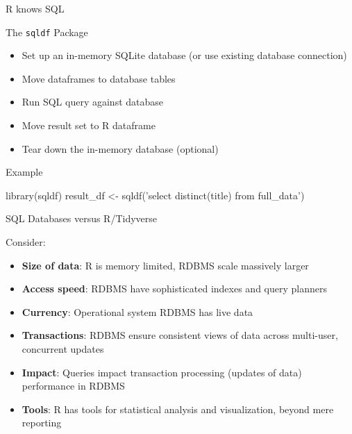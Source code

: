 \documentclass[ignorenonframetext,xcolor=x11names]{beamer}
\begin{document}
\begin{frame}[fragile]{R knows SQL}

\begin{block}{The \texttt{sqldf} Package}
  \begin{itemize}
     \item Set up an in-memory SQLite database (or use existing database connection)
     \item Move dataframes to database tables
     \item Run SQL query against database
     \item Move result set to R dataframe
     \item Tear down the in-memory database (optional)
  \end{itemize}
\end{block}

\begin{block}{Example}
\small
\begin{Rcode}
library(sqldf)
result_df <- 
   sqldf('select distinct(title) from full_data')
\end{Rcode}
\end{block}
\end{frame}


\begin{frame}{SQL Databases versus R/Tidyverse}
\begin{block}{Consider:}
  \begin{itemize}
     \item \textbf{Size of data}: R is memory limited, RDBMS scale massively larger
     \item \textbf{Access speed}: RDBMS have sophisticated indexes and query planners
     \item \textbf{Currency}: Operational system RDBMS has live data
     \item \textbf{Transactions}: RDBMS ensure consistent views of data across multi-user, concurrent updates
     \item \textbf{Impact}: Queries impact transaction processing (updates of data) performance in RDBMS 
     \item \textbf{Tools}: R has tools for statistical analysis and visualization, beyond mere reporting
  \end{itemize}
\end{block}
\end{frame}
\end{document}
